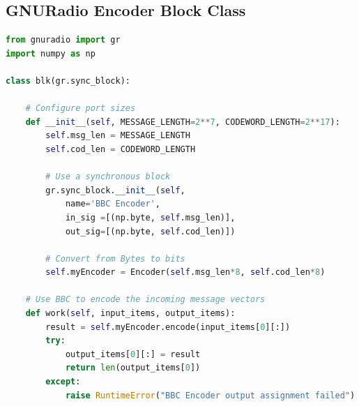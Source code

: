 \documentclass[conference]{IEEEtran}
\begin{document}
\subsection{GNURadio Encoder Block Class}
\label{GnuEncodeAppendix}
\begin{lstlisting}[language=Python]
from gnuradio import gr
import numpy as np

class blk(gr.sync_block):

    # Configure port sizes
    def __init__(self, MESSAGE_LENGTH=2**7, CODEWORD_LENGTH=2**17):
        self.msg_len = MESSAGE_LENGTH
        self.cod_len = CODEWORD_LENGTH

        # Use a synchronous block
        gr.sync_block.__init__(self,
            name='BBC Encoder',
            in_sig =[(np.byte, self.msg_len)],    
            out_sig=[(np.byte, self.cod_len)])
        
        # Convert from Bytes to bits
        self.myEncoder = Encoder(self.msg_len*8, self.cod_len*8)
    
    # Use BBC to encode the incoming message vectors
    def work(self, input_items, output_items):
        result = self.myEncoder.encode(input_items[0][:])        
        try:
            output_items[0][:] = result
            return len(output_items[0])
        except:
            raise RuntimeError("BBC Encoder output assignment failed")
\end{lstlisting}

\newpage
\end{document}
